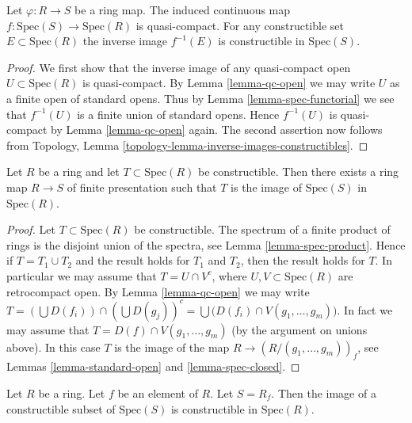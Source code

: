 \begin{lemma}
\label{lemma-affine-map-quasi-compact}
Let $\varphi : R \to S$ be a ring map.
The induced continuous map $f : \text{Spec}(S) \to \text{Spec}(R)$
is quasi-compact. For any constructible set $E \subset \text{Spec}(R)$
the inverse image $f^{-1}(E)$ is constructible in $\text{Spec}(S)$.
\end{lemma}

\begin{proof}
We first show that the inverse image of any quasi-compact
open $U \subset \text{Spec}(R)$ is quasi-compact. By
Lemma \ref{lemma-qc-open} we may write $U$ as a finite
open of standard opens. Thus by Lemma \ref{lemma-spec-functorial}
we see that $f^{-1}(U)$ is a finite union of standard opens.
Hence $f^{-1}(U)$ is quasi-compact by Lemma \ref{lemma-qc-open} again.
The second assertion now follows from Topology, Lemma
\ref{topology-lemma-inverse-images-constructibles}.
\end{proof}

\begin{lemma}
\label{lemma-constructible-is-image}
Let $R$ be a ring and let $T \subset \text{Spec}(R)$
be constructible. Then there exists a ring map $R \to S$ of
finite presentation such that $T$ is the image of
$\text{Spec}(S)$ in $\text{Spec}(R)$.
\end{lemma}

\begin{proof}
Let $T \subset \text{Spec}(R)$ be constructible.
The spectrum of a finite product of rings
is the disjoint union of the spectra, see
Lemma \ref{lemma-spec-product}. Hence if $T = T_1 \cup T_2$
and the result holds for $T_1$ and $T_2$, then the
result holds for $T$. In particular we may assume
that $T = U \cap V^c$, where $U, V \subset \text{Spec}(R)$
are retrocompact open. By Lemma \ref{lemma-qc-open} we may write
$T = (\bigcup D(f_i)) \cap (\bigcup D(g_j))^c =
\bigcup \big(D(f_i) \cap V(g_1, \ldots, g_m)\big)$.
In fact we may assume that $T = D(f) \cap V(g_1, \ldots, g_m)$
(by the argument on unions above).
In this case $T$ is the image of the map
$R \to (R/(g_1, \ldots, g_m))_f$, see Lemmas
\ref{lemma-standard-open} and \ref{lemma-spec-closed}.
\end{proof}

\begin{lemma}
\label{lemma-open-fp}
Let $R$ be a ring.
Let $f$ be an element of $R$.
Let $S = R_f$.
Then the image of a constructible subset of $\text{Spec}(S)$
is constructible in $\text{Spec}(R)$.
\end{lemma}

